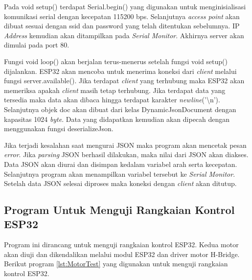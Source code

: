 Pada void setup() terdapat Serial.begin() yang digunakan untuk menginisialisasi komunikasi serial dengan kecepatan 115200 bps. Selanjutnya \emph{access point} akan dibuat sesuai dengan ssid dan password yang telah ditentukan sebelumnya. IP \emph{Address} kemudian akan ditampilkan pada \emph{Serial Monitor}. Akhirnya server akan dimulai pada port 80.

Fungsi void loop() akan berjalan terus-menerus setelah fungsi void setup() dijalankan. ESP32 akan mencoba untuk menerima koneksi dari \emph{client} melalui fungsi server.available(). Jika terdapat \emph{client} yang terhubung maka ESP32 akan memeriksa apakah \emph{client} masih tetap terhubung. Jika terdapat data yang tersedia maka data akan dibaca hingga terdapat karakter \emph{newline}('\textbackslash n'). Selanjutnya objek doc akan dibuat dari kelas DynamicJsonDocument dengan kapasitas 1024 \emph{byte}. Data yang didapatkan kemudian akan dipecah dengan menggunakan fungsi deserializeJson.

Jika terjadi kesalahan saat mengurai JSON maka program akan mencetak pesan \emph{error}. Jika \emph{parsing} JSON berhasil dilakukan, maka nilai dari JSON akan diakses. Data JSON akan diurai dan disimpan kedalam variabel arah serta kecepatan. Selanjutnya program akan menampilkan variabel tersebut ke \emph{Serial Monitor}. Setelah data JSON selesai diproses maka koneksi dengan \emph{client} akan ditutup.

\subsection{Program Untuk Menguji Rangkaian Kontrol ESP32}

Program ini dirancang untuk menguji rangkaian kontrol ESP32. Kedua motor akan diuji dan dikendalikan melalui modul ESP32 dan driver motor H-Bridge. Berikut program \ref{lst:MotorTest} yang digunakan untuk menguji rangkaian kontrol ESP32.

